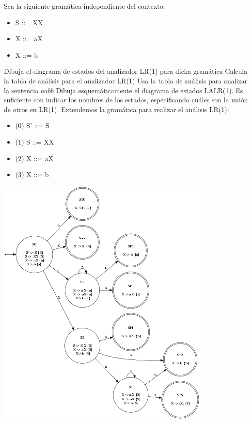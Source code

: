 \documentclass[nochap]{apuntes}
\begin{document}
\begin{problem}
Sea la siguiente gramática independiente del contexto:
\begin{itemize}
\item S ::= XX
\item X ::= aX
\item X ::= b
\end{itemize}
\ppart Dibuja el diagrama de estados del analizador LR(1) para dicha gramática
\ppart Calcula la tabla de análisis para el analizador LR(1)
\ppart Usa la tabla de análisis para analizar la sentencia $aabb$
\ppart Dibuja esquemáticamente el diagrama de estados LALR(1). Es suficiente con indicar los nombres de los estados, especificando cuáles son la unión de otros en LR(1).
\solution
\ppart Extendemos la gramática para realizar el análisis LR(1):

\begin{itemize}
\item (0) S' ::= S
\item (1) S ::= XX
\item (2) X ::= aX
\item (3) X ::= b
\end{itemize}
\begin{center}
\includegraphics[scale=0.65]{automata9.png}
\end{center}


\end{problem}
\end{document}
